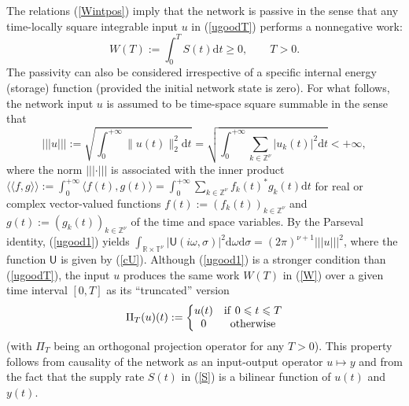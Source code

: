 \documentclass[letterpaper, 10pt, conference]{ieeeconf}  %
\def\<{\leqslant}           %
\def\>{\geqslant}           %
\def\mZ{\mathbb{Z}}    %
\def\mR{\mathbb{R}}    %
\def\bra{{\langle}}
\def\ket{{\rangle}}
\def\dbra{\langle\!\!\langle}
\def\dket{\rangle\!\!\rangle}
\def\rd{\mathrm{d}}        %
\def\x{\times}
\def\sU{\mathsf{U}}
\def\mT{\mathbb{T}}
\def\mZ{\mathbb{Z}}
\def\sn{|\!|\!|}
\begin{document}
The relations (\ref{Wintpos}) imply that the network is passive %
in the sense that any time-locally square integrable input $u$ in (\ref{ugoodT}) performs a nonnegative work:
\begin{equation}
\label{W}
    W(T)
    :=
  \int_0^T S(t)\rd t
  \>
  0,
  \qquad
  T>0.
\end{equation}
The passivity
can also be considered irrespective of a specific internal energy (storage) function (provided the initial network state is zero). For what follows, the network input $u$ is assumed to be time-space square summable in the sense that
\begin{equation}
\label{ugood1}
    \sn u \sn
    :=
    \sqrt{
    \int_0^{+\infty}
    \|u(t)\|_2^2
    \rd t}
    =
    \sqrt{
    \int_0^{+\infty}
    \sum_{k \in \mZ^\nu}
    |u_k(t)|^2
    \rd t}
    <+\infty,
\end{equation}
where
the norm $\sn \cdot \sn$ is associated with the inner product
$
    \dbra f, g \dket
    :=
    \int_0^{+\infty}
    \bra
        f(t),
        g(t)
    \ket
    =
    \int_0^{+\infty}
    \sum_{k \in \mZ^\nu}
    f_k(t)^* g_k(t)
    \rd t
$
for real or complex vector-valued functions $f(t):= (f_k(t))_{k \in \mZ^\nu}$ and $g(t):=(g_k(t))_{k \in \mZ^\nu}$ of the time and space variables. By the Parseval identity, (\ref{ugood1}) yields
$    \int_{\mR \x \mT^{\nu}}
    |\sU(i\omega, \sigma)|^2
    \rd \omega \rd \sigma
    =
    (2\pi)^{\nu+1}
    \sn u \sn^2
$,
where the function $\sU$ is given by (\ref{cU}). Although (\ref{ugood1}) is a stronger condition than (\ref{ugoodT}), the input $u$ produces the same work $W(T)$ in (\ref{W}) over a given time interval $[0,T]$  as its ``truncated'' version
\begin{equation}
\label{PiT}
\Pi_T(u)(t)
:=
\left\{
\begin{matrix}
u(t) & {\rm if}\ 0\< t\< T\\
0    & {\rm otherwise}
\end{matrix}
\right.
\end{equation}
(with $\Pi_T$ being an orthogonal projection operator for any $T>0$).
This property follows from causality of the network as an input-output operator $u\mapsto y$ and from the fact that the   supply rate $S(t)$ in (\ref{S}) is a bilinear function of $u(t)$ and $y(t)$.
\end{document}
